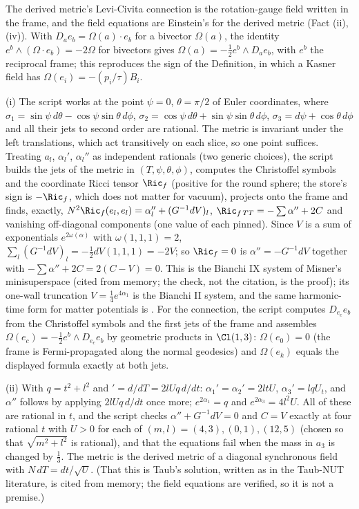 The derived metric's Levi-Civita connection is the rotation-gauge field written in the frame, and the field equations are Einstein's for the derived metric (Fact (ii), (iv)). With $D_{a}e_{b} = \Omega(a)\cdot e_{b}$ for a bivector $\Omega(a)$, the identity $e^{b}\wedge(\Omega\cdot e_{b}) = -2\Omega$ for bivectors gives $\Omega(a) = -\tfrac12 e^{b}\wedge D_{a}e_{b}$, with $e^{b}$ the reciprocal frame; this reproduces the sign of the Definition, in which a Kasner field has $\Omega(e_{i}) = -(p_{i}/\tau)B_{i}$.

(i) The script works at the point $\psi = 0$, $\theta = \pi/2$ of Euler coordinates, where $\sigma_{1} = \sin\psi\,d\theta - \cos\psi\sin\theta\,d\phi$, $\sigma_{2} = \cos\psi\,d\theta + \sin\psi\sin\theta\,d\phi$, $\sigma_{3} = d\psi + \cos\theta\,d\phi$ and all their jets to second order are rational. The metric is invariant under the left translations, which act transitively on each slice, so one point suffices. Treating $a_{l}$, $\alpha_{l}'$, $\alpha_{l}''$ as independent rationals (two generic choices), the script builds the jets of the metric in $(T, \psi, \theta, \phi)$, computes the Christoffel symbols and the coordinate Ricci tensor $\Ric_{f}$ (positive for the round sphere; the store's sign is $-\Ric_{f}$, which does not matter for vacuum), projects onto the frame and finds, exactly, $N^{2}\Ric_{f}(e_{l}, e_{l}) = \alpha_{l}'' + (G^{-1}dV)_{l}$, $\Ric_{f\,TT} = -\sum\alpha'' + 2C$ and vanishing off-diagonal components (one value of each pinned). Since $V$ is a sum of exponentials $e^{2\omega(\alpha)}$ with $\omega(1, 1, 1) = 2$, $\sum_{l}(G^{-1}dV)_{l} = -\tfrac12 dV(1, 1, 1) = -2V$; so $\Ric_{f} = 0$ is $\alpha'' = -G^{-1}dV$ together with $-\sum\alpha'' + 2C = 2(C - V) = 0$. This is the Bianchi IX system of Misner's minisuperspace (cited from memory; the check, not the citation, is the proof); its one-wall truncation $V = \tfrac14e^{4\alpha_{1}}$ is the Bianchi II system, and the same harmonic-time form for matter potentials is . For the connection, the script computes $D_{e_{c}}e_{b}$ from the Christoffel symbols and the first jets of the frame and assembles $\Omega(e_{c}) = -\tfrac12 e^{b}\wedge D_{e_{c}}e_{b}$ by geometric products in $\Cl(1,3)$: $\Omega(e_{0}) = 0$ (the frame is Fermi-propagated along the normal geodesics) and $\Omega(e_{k})$ equals the displayed formula exactly at both jets.

(ii) With $q = t^{2} + l^{2}$ and $' = d/dT = 2lUq\,d/dt$: $\alpha_{1}' = \alpha_{2}' = 2ltU$, $\alpha_{3}' = lqU_{t}$, and $\alpha''$ follows by applying $2lUq\,d/dt$ once more; $e^{2\alpha_{1}} = q$ and $e^{2\alpha_{3}} = 4l^{2}U$. All of these are rational in $t$, and the script checks $\alpha'' + G^{-1}dV = 0$ and $C = V$ exactly at four rational $t$ with $U > 0$ for each of $(m, l) = (4, 3), (0, 1), (12, 5)$ (chosen so that $\sqrt{m^{2} + l^{2}}$ is rational), and that the equations fail when the mass in $a_{3}$ is changed by $\tfrac13$. The metric is the derived metric of a diagonal synchronous field with $N\,dT = dt/\sqrt U$. (That this is Taub's solution, written as in the Taub-NUT literature, is cited from memory; the field equations are verified, so it is not a premise.)

